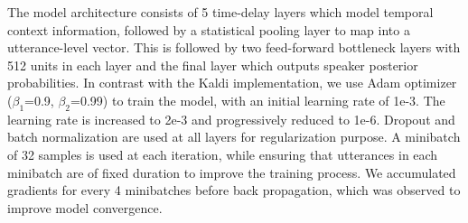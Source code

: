 The model architecture consists of 5 time-delay layers which model temporal context information, followed by a statistical pooling layer to map into a utterance-level vector. This is followed by two feed-forward bottleneck layers with 512 units in each layer and the final layer which outputs speaker posterior probabilities. In contrast with the Kaldi implementation, we use Adam optimizer ($\beta_1$=0.9, $\beta_2$=0.99) to train the model, with an initial learning rate of 1e-3. The learning rate is increased to 2e-3 and progressively reduced to 1e-6. Dropout and batch normalization are used at all layers for regularization purpose. A minibatch of 32 samples is used at each iteration, while ensuring that utterances in each minibatch are of fixed duration to improve the training process. We accumulated gradients for every 4 minibatches before back propagation, which was observed to improve model convergence.

\begin{table}
\caption{Selecting a baseline system for speaker diarization. For each embedding and clustering method (AHC-f: AHC with fixed threshold, AHC-p: AHC with optimized threshold, bSC: binarized spectral clustering with normalized maximum eignegap), diarization error rate (DER \%) is provided for two settings: using oracle speaker count (Oracle) and estimated count (Est). }
\label{tab:spkrDiarBase}
\end{table}

